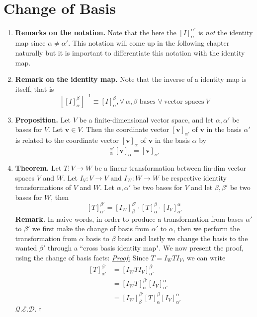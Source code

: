 \documentclass[oneside, 12pt]{book}
\newcommand{\settag}[1]{\renewcommand{\theenumi}{#1}}
\newcommand{\qed}{\hfill $\mathcal{Q}.\mathcal{E}.\mathcal{D}.\dagger$}
\newcommand{\tbf}[1]{\textbf{#1}}
\newcommand{\tit}[1]{\textit{#1}}
\newcommand{\proof}{\tit{\underline{Proof:}}} %
\newcommand{\trans}[3]{$#1:#2\rightarrow{}#3$}
\newcommand{\map}[3]{\text{$\left[#1\right]_{#2}^{#3}$}}
\newcommand{\para}[1]{\item \tbf{#1}}
\newcommand{\vv}{\mathbf{v}}
\begin{document}
\section{Change of Basis}
\begin{enumerate}
    \settag{2.7.2}
    \para{Remarks on the notation.} Note that the here the $[I]_\alpha^{\alpha'}$ is \textit{not} the identity map since $\alpha \neq \alpha'$. This notation will come up in the following chapter naturally but it is important to differentiate this notation with the identity map.
    
    \settag{2.7.*}
    \para{Remark on the identity map.} Note that the inverse of a identity map is itself, that is
    \begin{equation*}
        \left[\map{I}{\alpha}{\beta}\right]^{-1} \equiv \map{I}{\alpha}{\beta}, \forall~\text{$\alpha,\beta$ bases $\forall~\text{vector spaces}~V$}
    \end{equation*}
    
    \settag{2.7.3}
    \para{Proposition.} Let $V$ be a finite-dimensional vector space, and let $\alpha, \alpha'$ be bases for $V$. Let $\vv \in V$. Then the coordinate vector $[\vv]_{\alpha'}$ of $\vv$ in the basis $\alpha'$ is related to the coordinate vector $[\vv]_\alpha$ of $\vv$ in the basis $\alpha$ by
    \begin{equation*}
        [I]_\alpha^{\alpha'}[\vv]_\alpha = [\vv]_{\alpha'}
    \end{equation*}
    
    \settag{2.7.5}
    \para{Theorem.} Let \trans{T}{V}{W} be a linear transformation between fin-dim vector spaces $V$ and $W$. Let \trans{I_V}{V}{V} and \trans{I_W}{W}{W} be respective identity transformations of $V$ and $W$. Let $\alpha, \alpha'$ be two bases for $V$ and let $\beta, \beta'$ be two bases for $W$, then
    \begin{equation*}
        \map{T}{\alpha'}{\beta'} = \map{I_W}{\beta}{\beta'}\cdot \map{T}{\alpha}{\beta}\cdot \map{I_V}{\alpha'}{\alpha}
    \end{equation*}
    \textbf{Remark.} In naive words, in order to produce a transformation from bases $\alpha'$ to $\beta'$ we first make the change of basis from $\alpha'$ to $\alpha$, then we perform the transformation from $\alpha$ basis to $\beta$ basis and lastly we change the basis to the wanted $\beta'$ through a ``cross basis identity map". \newline
    We now present the proof, using the change of basis facts: \newline
    \proof \newline
    Since $T = I_WTI_V$, we can write
    \begin{align*}
        \map{T}{\alpha'}{\beta'} &= \map{I_WTI_V}{\alpha'}{\beta'} \\
        &= \map{I_WT}{\alpha}{\beta'}\map{I_V}{\alpha'}{\alpha} \\
        &= \map{I_W}{\beta}{\beta'}\map{T}{\alpha}{\beta} \map{I_V}{\alpha'}{\alpha}
    \end{align*}
    \qed
    

\end{enumerate}
\end{document}
